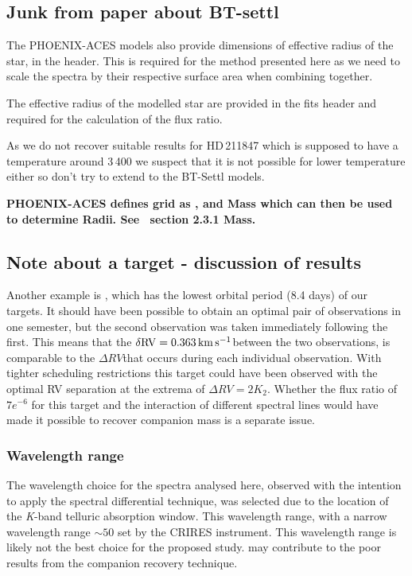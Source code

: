 \subsection{Junk from paper about BT-settl}

The {PHOENIX-ACES} models also provide dimensions of effective radius of the star, in the header.
This is required for the method presented here as we need to scale the spectra by their respective surface area when combining together.


The effective radius of the modelled star are provided in the fits header and required for the calculation of the flux ratio.


As we do not recover suitable results for HD\,211847 which is supposed to have a temperature around 3\,400\K{} we suspect that it is not possible for lower temperature either so don't try to extend to the {BT-Settl} models.


\textbf{
     {PHOENIX-ACES} defines grid as \Teff{}, \logg{} and Mass which can then be used to determine Radii.
See~\citep{husser_new_2013} section 2.3.1 Mass.}




\subsection{Note about a target - discussion of results}
Another example is , which has the lowest orbital period (8.4 days) of our targets.
It should have been possible to obtain an optimal pair of observations in one semester, but the second observation was taken immediately following the first.
This means that the \(\rm \delta {RV} = 0.363\,\si{\kilo\metre\per\second}{}\)between the two observations, is comparable to the \(\Delta {RV}\)that occurs during each individual observation.
With tighter scheduling restrictions this target could have been observed with the optimal {RV} separation at the extrema of \(\Delta {RV}=2 K_{2}\).
Whether the flux ratio of \(7e^{-6}\) for this target and the interaction of different spectral lines would have made it possible to recover companion mass is a separate issue.



\subsubsection{Wavelength range}
The wavelength choice for the spectra analysed here, observed with the intention to apply the spectral differential technique, was selected due to the location of the \emph{K}-band telluric absorption window.
This wavelength range, with a narrow wavelength range \(\sim50\)\nm{} set by the {CRIRES} instrument.
This wavelength range is likely not the best choice for the proposed study.  may contribute to the poor results from the companion recovery technique.

